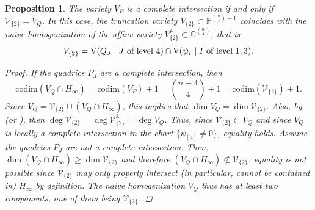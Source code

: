 \documentclass[11pt,reqno]{amsart}
\newtheorem{proposition}[theorem]{Proposition}
\theoremstyle{definition}
\numberwithin{theorem}{section}
\newcommand{\codim}{\mathrm{codim}}
\numberwithin{equation}{section}
\begin{document}
\begin{proposition} \label{ci iff sat}
    The variety $V_P$ is a complete intersection if and only if $\mathscr{V}_{\{2\}} = V_Q$.
    In this case, the truncation variety $V_{\{2\}} \subset \mathbb P^{{n \choose 4}-1}$ coincides with the naive homogenization of the affine variety $V_{\{2\}}^{\mathbb A} \subset \mathbb C^{n \choose 4}$, that is
    \[ V_{\{2\}} = {\normalfont \textrm{V}(Q_J \mid J \textrm{ of level }4) \cap \textrm{V}(\psi_I \mid I \textrm{ of level }1,3)} .\]
    \begin{proof}
        If the quadrics $P_J$ are a complete intersection, then $$\codim (V_Q \cap H_\infty) = \codim (V_P)+1 = {{n-4} \choose 4}+1 = \codim (\mathscr{V}_{\{2\}})+1.$$
        Since $V_Q = \mathscr{V}_{\{2\}} \cup (V_Q \cap H_\infty)$, this implies that $\dim V_Q = \dim \mathscr{V}_{\{2\}}$. Also, by \cite[Corollary 2.1]{brysiewicz2019degree} (or \cite[Proposition 16]{brysiewicz2023lawrence}), then $\deg \mathscr{V}_{\{2\}} = \deg \mathscr{V}_{\{2\}}^{\mathbb A} = \deg V_Q$. 
        Thus, since $\mathscr{V}_{\{2\}} \subset V_Q$ and since $V_Q$ is locally a complete intersection in the chart $\{\psi_{[4]}\neq 0\}$, equality holds.
        Assume the quadrics $P_J$ are not a complete intersection. Then, $\dim (V_Q \cap H_\infty) \geq \dim \mathscr{V}_{\{2\}}$ and therefore $(V_Q \cap H_\infty) \not\subset \mathscr{V}_{\{2\}}$: equality is not possible since $\mathscr{V}_{\{2\}}$ may only properly intersect (in particular, cannot be contained in) $H_\infty$ by definition.
        The naive homogenization $V_Q$ thus has at least two components, one of them being $\mathscr{V}_{\{2\}}$.
    \end{proof}
\end{proposition}
\end{document}
